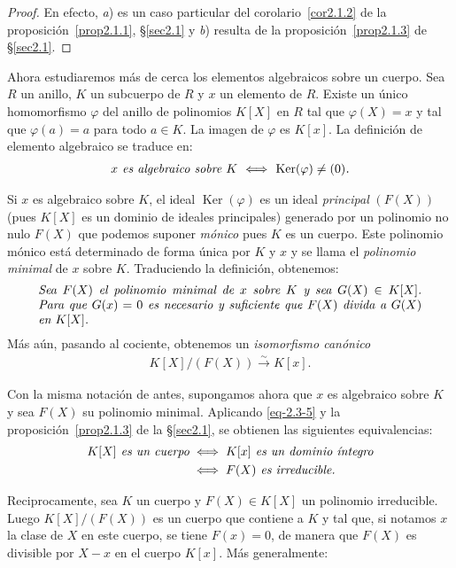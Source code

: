 \documentclass[10pt,oneside,bibtotoc,smallheadings,leqno,a5paper,DIV=12]{scrbook}
\renewcommand{\to}[1][]{\xrightarrow{#1}}
\DeclareMathOperator{\Ker}{Ker}
\numberwithin{equation}{section}
\theoremstyle{defi}
\theoremstyle{enonce}
\theoremstyle{rem}
\numberwithin{theorem}{section}
\numberwithin{proposition}{section}
\numberwithin{definition}{section}
\numberwithin{lemma}{section}
\numberwithin{corollary}{section}
\numberwithin{example}{section}
\numberwithin{footnote}{section}%
\begin{document}
\begin{proof}
En efecto, {\itshape a}) es un caso particular del corolario~\ref{cor2.1.2} de la proposici\'on~\ref{prop2.1.1}, \S\ref{sec2.1}
y {\itshape b}) resulta de la proposici\'on~\ref{prop2.1.3} de \S\ref{sec2.1}.
\end{proof}

Ahora estudiaremos m\'as de cerca los elementos algebraicos sobre un cuerpo. Sea $R$ un anillo, $K$ un subcuerpo
de $R$ y $x$ un elemento de $R$. Existe un \'unico homomorfismo $\varphi$ del anillo de polinomios $K[X]$ en
$R$ tal que $\varphi(X) = x$ y tal que $\varphi(a) = a$ para todo $a\in K$. La imagen de $\varphi$ es $K[x]$.
La definici\'on de elemento algebraico se traduce en:
\begin{gather}\label{eq-2.3-4}
\text{\itshape $x$ es algebraico sobre $K$ $\iff$ $\Ker(\varphi)\neq(0)$.}
\end{gather}

Si $x$ es algebraico sobre $K$, el ideal $\Ker(\varphi)$ es un ideal {\em principal} $(F(X))$
(pues $K[X]$ es un dominio de ideales principales) generado por un polinomio no nulo $F(X)$ que podemos
suponer {\em m\'onico} pues $K$ es un cuerpo. Este polinomio m\'onico est\'a determinado de forma \'unica por
$K$ y $x$ y se llama el {\em polinomio minimal} de $x$ sobre $K$. Traduciendo la definici\'on, obtenemos:
\begin{gather}\label{eq-2.3-5}
\text{\parbox{0.9\textwidth}{\itshape Sea $F(X)$ el polinomio minimal de $x$ sobre $K$ y sea $G(X)\in K[X]$. Para que
$G(x) = 0$ es necesario y suficiente que $F(X)$ divida a $G(X)$ en $K[X]$.}}
\end{gather}
M\'as a\'un, pasando al cociente, obtenemos un {\em isomorfismo can\'onico}
\begin{gather}\label{eq-2.3-6}
K[X]/(F(X))\to[\sim] K[x].
\end{gather}

Con la misma notaci\'on de antes, supongamos ahora que $x$ es algebraico sobre $K$ y sea $F(X)$ su polinomio
minimal. Aplicando \eqref{eq-2.3-5} y la proposici\'on~\ref{prop2.1.3} de la \S\ref{sec2.1}, se obtienen las siguientes equivalencias:
\begin{align}
\text{\itshape $K[X]$ es un cuerpo} &\iff \text{\itshape $K[x]$ es un dominio \'integro}\\
&\iff \text{\itshape $F(X)$ es irreducible.}\notag
\end{align}

Reciprocamente, sea $K$ un cuerpo y $F(X)\in K[X]$ un polinomio irreducible. Luego $K[X]/(F(X))$ es un cuerpo
que contiene a $K$ y tal que, si notamos $x$ la clase de $X$ en este cuerpo, se tiene $F(x) = 0$, de manera que
$F(X)$ es divisible por $X-x$ en el cuerpo $K[x]$. M\'as generalmente:
\end{document}

